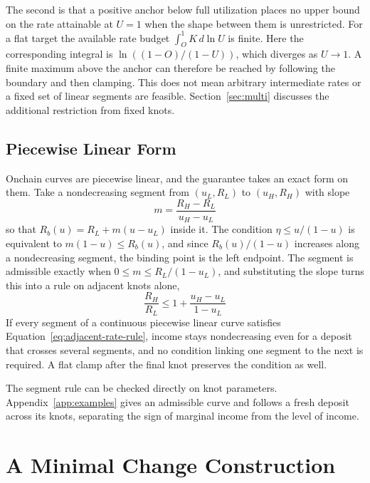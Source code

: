 \documentclass[11pt,a4paper]{article}
\begin{document}
The second is that a positive anchor below full utilization places no upper bound on the rate attainable at $U=1$ when the shape between them is unrestricted. For a flat target the available rate budget $\int_O^1 K\,d\ln U$ is finite. Here the corresponding integral is $\ln((1-O)/(1-U))$, which diverges as $U\to1$. A finite maximum above the anchor can therefore be reached by following the boundary and then clamping. This does not mean arbitrary intermediate rates or a fixed set of linear segments are feasible. Section~\ref{sec:multi} discusses the additional restriction from fixed knots.

\subsection{Piecewise Linear Form}

Onchain curves are piecewise linear, and the guarantee takes an exact form on them. Take a nondecreasing segment from $(u_L,R_L)$ to $(u_H,R_H)$ with slope
\[
m=\frac{R_H-R_L}{u_H-u_L}
\]
so that $R_b(u)=R_L+m(u-u_L)$ inside it. The condition $\eta\leq u/(1-u)$ is equivalent to $m(1-u)\leq R_b(u)$, and since $R_b(u)/(1-u)$ increases along a nondecreasing segment, the binding point is the left endpoint. The segment is admissible exactly when $0\leq m\leq R_L/(1-u_L)$, and substituting the slope turns this into a rule on adjacent knots alone,
\begin{equation}
\boxed{
\frac{R_H}{R_L}
\leq
1+\frac{u_H-u_L}{1-u_L}
}
\label{eq:adjacent-rate-rule}
\end{equation}
If every segment of a continuous piecewise linear curve satisfies Equation~\ref{eq:adjacent-rate-rule}, income stays nondecreasing even for a deposit that crosses several segments, and no condition linking one segment to the next is required. A flat clamp after the final knot preserves the condition as well.

The segment rule can be checked directly on knot parameters. Appendix~\ref{app:examples} gives an admissible curve and follows a fresh deposit across its knots, separating the sign of marginal income from the level of income.

\section{A Minimal Change Construction}
\label{sec:minimal}
\end{document}
